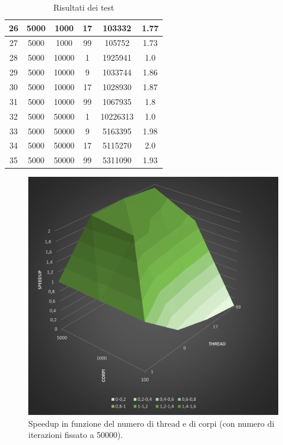 \documentclass[12pt,a4paper,openright,twoside]{book}
\begin{document}
\begin{table}[h!]
\begin{tabular}{ |c|c|c|c|c|c| }
		\hline
		26 & 5000 & 1000 & 17 & 103332 & 1.77 \\ 
		\hline
		27 & 5000 & 1000 & 99 & 105752 & 1.73 \\ 
		\hline
		28 & 5000 & 10000 & 1 & 1925941 & 1.0 \\ 
		\hline
		29 & 5000 & 10000 & 9 & 1033744 & 1.86 \\ 
		\hline
		30 & 5000 & 10000 & 17 & 1028930 & 1.87 \\ 
		\hline
		31 & 5000 & 10000 & 99 & 1067935 & 1.8 \\ 
		\hline
		32 & 5000 & 50000 & 1 & 10226313 & 1.0 \\ 
		\hline
		33 & 5000 & 50000 & 9 & 5163395 & 1.98 \\ 
		\hline
		34 & 5000 & 50000 & 17 & 5115270 & 2.0 \\ 
		\hline
		35 & 5000 & 50000 & 99 & 5311090 & 1.93 \\ 
		\hline
	\end{tabular}
	\caption{Risultati dei test}
	\label{tab:table1}
\end{table}

\begin{figure}
	\centering
	\includegraphics[width=0.9\linewidth]{figures/speedup-plot.png}
	\caption{Speedup in funzione del numero di thread e di corpi (con numero di iterazioni fissato a 50000).}
	\label{fig:speedup}
\end{figure}
\end{document}
